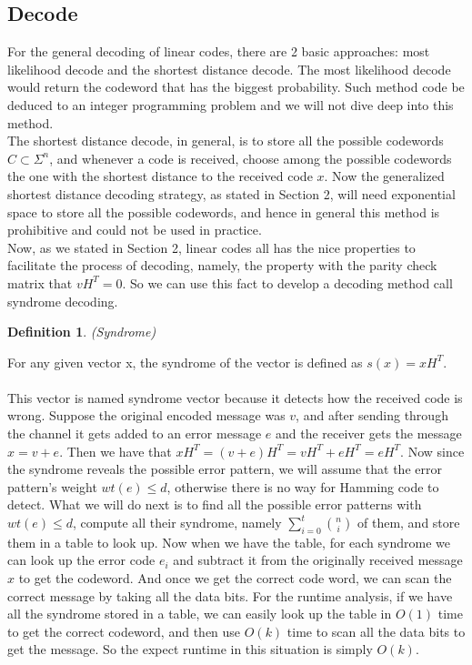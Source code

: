 \documentclass{article}
\newtheorem{Definition}{Definition}
\begin{document}
\subsection{Decode}
For the general decoding of linear codes, there are 2 basic approaches: most likelihood decode and the shortest distance decode. The most likelihood decode would return the codeword that has the biggest probability. Such method code be deduced to an integer programming problem and we will not dive deep into this method.\\
The shortest distance decode, in general, is to store all the possible codewords $C \subset \Sigma^n$, and whenever a code is received, choose among the possible codewords the one with the shortest distance to the received code $x$. Now the generalized shortest distance decoding strategy, as stated in Section 2, will need exponential space to store all the possible codewords, and hence in general this method is prohibitive and could not be used in practice.\\
Now, as we stated in Section 2, linear codes all has the nice properties to facilitate the process of decoding, namely, the property with the parity check matrix that $vH^T = 0$. So we can use this fact to develop a decoding method call syndrome decoding.\\
\begin{Definition}(Syndrome)\end{Definition}
\noindent For any given vector x, the syndrome of the vector is defined as $s(x) = xH^T$.\\\\
This vector is named syndrome vector because it detects how the received code is wrong. Suppose the original encoded message was $v$, and after sending through the channel it gets added to an error message $e$ and the receiver gets the message $x = v+e$. Then we have that $xH^T = (v+e)H^T = vH^T+eH^T = eH^T$. Now since the syndrome reveals the possible error pattern, we will assume that the error pattern's weight $wt(e) \le d$, otherwise there is no way for Hamming code to detect. What we will do next is to find all the possible error patterns with $wt(e) \le d$, compute all their syndrome, namely $ \sum_{i=0}^{t}{n \choose i} $ of them, and store them in a table to look up. Now when we have the table, for each syndrome we can look up the error code $e_i$ and subtract it from the originally received message $x$ to get the codeword. And once we get the correct code word, we can scan the correct message by taking all the data bits. For the runtime analysis, if we have all the syndrome stored in a table, we can easily look up the table in $O(1)$ time to get the correct codeword, and then use $O(k)$ time to scan all the data bits to get the message. So the expect runtime in this situation is simply $O(k)$.\\
\end{document}
